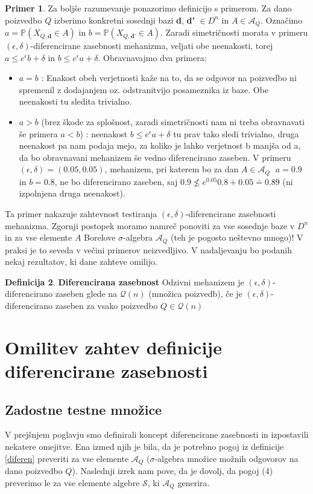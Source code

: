 \documentclass[12pt,a4paper]{amsart}
\theoremstyle{definition} %
\newtheorem{definicija}{Definicija}[section]
\newtheorem{primer}[definicija]{Primer}
\theoremstyle{plain} %
\begin{document}
\begin{primer}
Za boljše razumevanje ponazorimo definicijo s primerom. Za dano poizvedbo $Q$ izberimo konkretni sosednji bazi \textbf{d}, \textbf{d'} $\in D^n$ in $A\in \mathcal{A}_{Q}$. Označimo $a = \mathbb{P}(X_{Q,\textbf{d}}\in A)$ in $b = \mathbb{P}(X_{Q,\textbf{d'}}\in A)$. Zaradi simetričnosti morata v primeru $(\epsilon, \delta)$-diferencirane zasebnosti mehanizma, veljati obe neenakosti, torej $a \leq e^{\epsilon}b+\delta$ in $b \leq e^{\epsilon}a+\delta$. Obravnavajmo dva primera:
\begin{itemize}
\item $a=b$ : Enakost obeh verjetnosti kaže na to, da se odgovor na poizvedbo ni spremenil z dodajanjem oz. odstranitvijo posameznika iz baze. Obe neenakosti tu sledita trivialno.
\item $a>b$ (brez škode za splošnost, zaradi simetričnosti nam ni treba obravnavati še primera $a<b$) : neenakost $b \leq e^{\epsilon}a+\delta$ tu prav tako sledi trivialno, druga neenakost pa nam podaja mejo, za koliko je lahko verjetnost b manjša od a, da bo obravnavani mehanizem še vedno diferencirano zaseben. V primeru $(\epsilon, \delta) = (0.05, 0.05)$, mehanizem, pri katerem bo za dan $A \in \mathcal{A}_{Q}$ $\; a=0.9$ in $b=0.8$, ne bo diferencirano zaseben, saj $0.9 \nleq e^{0.05} 0.8 + 0.05 \doteq 0.89$ (ni izpolnjena druga neenakost).
\end{itemize}
Ta primer nakazuje  zahtevnost testiranja $(\epsilon, \delta)$-diferencirane zasebnosti mehanizma. Zgornji postopek moramo namreč ponoviti za vse sosednje baze v $D^n$ in za vse elemente $A$ Borelove $\sigma$-algebra $\mathcal{A}_Q$ (teh je pogosto neštevno mnogo)! V praksi je to seveda v večini primerov neizvedljivo. V nadaljevanju bo podanih nekaj rezultatov, ki dane zahteve omilijo.
\end{primer}


\begin{definicija} {\textbf{Diferencirana zasebnost}}
Odzivni mehanizem je $(\epsilon, \delta)$-diferencirano zaseben glede na $\mathcal{Q}(n)$ (množica poizvedb), če je $(\epsilon, \delta)$-diferencirano zaseben za vsako poizvedbo $Q \in \mathcal{Q}(n)$
\end{definicija}

\section{Omilitev zahtev definicije diferencirane zasebnosti}
\subsection{Zadostne testne množice}
V prejšnjem poglavju smo definirali koncept diferencirane zasebnosti in izpostavili nekatere omejitve. Ena izmed njih je bila, da je potrebno pogoj iz definicije \eqref{diferen} preveriti za vse elemente $\mathcal{A}_Q$ ($\sigma$-algebra množice možnih odgovorov na dano poizvedbo $Q$). Naslednji izrek nam pove, da je dovolj, da pogoj (4) preverimo le za vse elemente algebre $\mathcal{S}$, ki $\mathcal{A}_Q$ generira.
\end{document}
